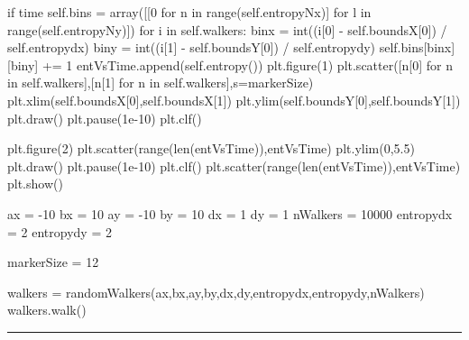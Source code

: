 \begin{codeexample}
\begin{VerbatimOut}{\listingFile}
            if time %
                self.bins = array([[0 for n in range(self.entropyNx)] for l in range(self.entropyNy)])
                for i in self.walkers:
                    binx = int((i[0] - self.boundsX[0]) / self.entropydx)
                    biny = int((i[1] - self.boundsY[0]) / self.entropydy)
                    self.bins[binx][biny] += 1
                entVsTime.append(self.entropy())
                plt.figure(1)
                plt.scatter([n[0] for n in self.walkers],[n[1] for n in self.walkers],s=markerSize)
                plt.xlim(self.boundsX[0],self.boundsX[1])
                plt.ylim(self.boundsY[0],self.boundsY[1])
                plt.draw()
                plt.pause(1e-10)
                plt.clf()

                plt.figure(2)
                plt.scatter(range(len(entVsTime)),entVsTime)
                plt.ylim(0,5.5)
                plt.draw()
                plt.pause(1e-10)
                plt.clf()
        plt.scatter(range(len(entVsTime)),entVsTime)
        plt.show()



ax = -10
bx = 10
ay = -10
by = 10
dx = 1
dy = 1
nWalkers = 10000
entropydx = 2
entropydy = 2


markerSize = 12

walkers = randomWalkers(ax,bx,ay,by,dx,dy,entropydx,entropydy,nWalkers)
walkers.walk()

\end{VerbatimOut}
\end{codeexample}
\else
\noindent\rule{5 in}{0.01 in}
\fi
